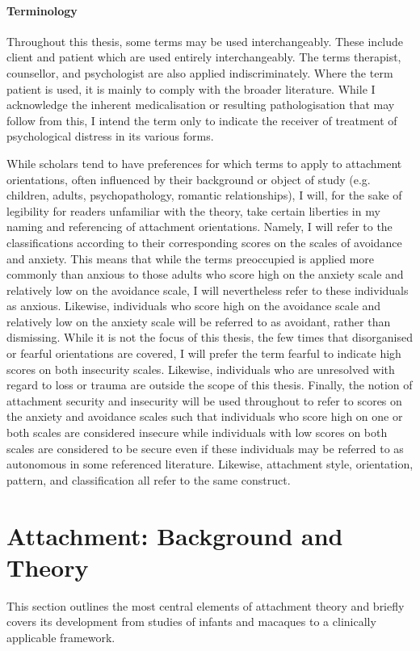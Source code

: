 \documentclass[12pt]{report}
\begin{document}
\subsubsection*{Terminology}
Throughout this thesis, some terms may be used interchangeably.
These include client and patient which are used entirely interchangeably.
The terms therapist, counsellor, and psychologist are also applied indiscriminately.
Where the term patient is used, it is mainly to comply with the broader literature.
While I acknowledge the inherent medicalisation or resulting pathologisation that may follow from this, I intend the term only to indicate the receiver of treatment of psychological distress in its various forms.

While scholars tend to have preferences for which terms to apply to attachment orientations, often influenced by their background or object of study (e.g. children, adults, psychopathology, romantic relationships), I will, for the sake of legibility for readers unfamiliar with the theory, take certain liberties in my naming and referencing of attachment orientations.
Namely, I will refer to the classifications according to their corresponding scores on the scales of avoidance and anxiety.
This means that while the terms preoccupied is applied more commonly than anxious to those adults who score high on the anxiety scale and relatively low on the avoidance scale, I will nevertheless refer to these individuals as anxious.
Likewise, individuals who score high on the avoidance scale and relatively low on the anxiety scale will be referred to as avoidant, rather than dismissing.
While it is not the focus of this thesis, the few times that disorganised or fearful orientations are covered, I will prefer the term fearful to indicate high scores on both insecurity scales.
Likewise, individuals who are unresolved with regard to loss or trauma are outside the scope of this thesis.
Finally, the notion of attachment security and insecurity will be used throughout to refer to scores on the anxiety and avoidance scales such that individuals who score high on one or both scales are considered insecure while individuals with low scores on both scales are considered to be secure even if these individuals may be referred to as autonomous in some referenced literature.
Likewise, attachment style, orientation, pattern, and classification all refer to the same construct.

\chapter{Attachment: Background and Theory}
This section outlines the most central elements of attachment theory and briefly covers its development from studies of infants and macaques to a clinically applicable framework.
\end{document}
